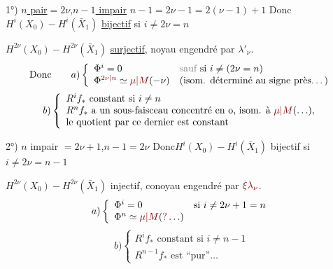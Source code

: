 1°) \uline{$n$ pair}$=2\nu$,\quad \uline{$n-1$ impair}
\qquad $n-1=2\nu-1=2(\nu-1)+1$
\diagram{\[
\left.\begin{array}{ll}
H^*(X_0):&
1,\xi_0,\ldots,\xi_0^{\nu-1},
[\xi_0^\nu,\lambda'_\nu],\frac12\xi_0^{\nu+1},\ldots,\frac12\xi_0^{2\nu-1}\\[5pt]
H^*(\bar X_1):&
1,\xi_1,\ldots,\xi_1^{\nu-1},
\frac12\xi_1^\nu,\frac12\unsure{\xi_1^{\nu+1}},\ldots,\frac12\xi_1^{2\nu-1}
\end{array}\right]
\quad
\begin{array}{l}\xi_0\rightsquigarrow\xi_1\\\lambda'_\nu\rightsquigarrow0\end{array}
\]}
Donc\quad $H^i(X_0)\mathbin{-}H^i(\bar X_1)$
\uline{bijectif}  si $i\ne2\nu=n$

$H^{2\nu}(X_0)\mathbin{-}H^{2\nu}(\bar X_1)$
\uline{surjectif}, noyau engendré par $\lambda'_\nu$.
\[
\text{Donc}\qquad
a)\left\{\begin{array}{ll}
\Phi^i=0&\deleted{\text{sauf}}\ \text{si }i\ne(2\nu=n)\\
\Phi^{\unsure{2\nu|n}}\simeq\unsure{\mu|M}(-\nu)&
\text{(isom. déterminé au signe près\ldots)}
\end{array}\right.
\]
\[
b)\left\{\begin{array}{l}
R^if_*\text{ constant si }i\ne n\\
R^nf_*\text{ a un sous-faisceau concentré en o, isom. à }\unsure{\mu|M}(\ldots),\\
\text{le quotient par ce dernier est constant}
\end{array}\right.
\]

2°) $n$ impair $=2\nu+1$,\qquad $n-1=2\nu$
\diagram{\[
\left.\begin{array}{ll}
H^*(X_0):&
1,\xi_0,\ \xi_0^{\nu-1},\ \xi_0^\nu,\ \frac12\xi_0^{\nu+1},
\ldots,\frac12\xi_0^{2\nu}\\[5pt]
H^*(\bar X_1):&
1,\xi_1,\ldots,\xi_1^{\nu-1},[\xi_1^\nu,\lambda_\nu],
\frac12\xi_1^{\nu+1},\ldots,\frac12\xi_1^{2\nu}
\end{array}\right]
\quad\xi_0\rightsquigarrow\xi_1
\]}
Donc\quad $H^i(X_0)\mathbin{-}H^i(\bar X_1)$ bijectif si $i\ne2\nu=n-1$

$H^{2\nu}(X_0)\mathbin{-}H^{2\nu}(\bar X_1)$ injectif,
conoyau engendré par $\deleted{\unsure{\xi}}\unsure{\lambda_\nu}$.
\[
a)\left\{\begin{array}{ll}
\Phi^i=0&\text{si }i\ne2\nu+1=n\\
\Phi^n\simeq\unsure{\mu|M}(\unsure{?}\ldots)&
\end{array}\right.
\]
\[
b)\left\{\begin{array}{l}
R^if_*\text{ constant si }i\ne n-1\\
R^{n-1}f_*\text{ est ``pur''}\ldots
\end{array}\right.
\]
